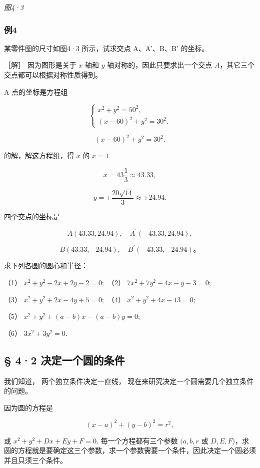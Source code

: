 \emph{图4·3}

\subsubsection{例4}\label{ux4f8b4-7}

某零件图的尺寸如图4·3 所示，试求交点 A、A'、B、B' 的坐标。

［解］ 因为图形是关于 \(x\) 轴和 \(y\) 轴对称的，因此只要求出一个交点
\(A\)，其它三个交点都可以根据对称性质得到。

A 点的坐标是方程组

\[
\left\{ \begin{array}{l} x^{2} + y^{2} = 50^{2}, \\ (x - 60) ^ {2} + y^{2} = 30^{2}. \end{array} \right. \tag {1}
\]

\[
(x - 60) ^ {2} + y^{2} = 30^{2}. \tag {2}
\]

的解，解这方程组，得 \(x\) 的 \(x = 1\)

\[
x = 43 \frac {1}{3} \approx 43. 33,
\]

\[
y = \pm \frac {20 \sqrt {14}}{3} \approx \pm 24. 94.
\]

四个交点的坐标是

\[
A (43. 33, 24. 94), \quad A^{\prime} (- 43. 33, 24. 94),
\]

\[
B (43. 33, - 24. 94), \quad B^{\prime} (- 43. 33, - 24. 94)\text{。}
\]

求下列各圆的圆心和半径：

（1） \(x^{2} + y^{2} - 2x + 2y - 2 = 0;\) （2）
\(7x^{2} + 7y^{2} - 4x - y - 3 = 0;\)

（3） \(x^{2} + y^{2} + 2x - 4y + 5 = 0;\) （4）
\(x^{2} + y^{2} + 4x - 13 = 0;\)

（5） \(x^{2} + y^{2} + (a - b)x - (a - b)y = 0;\)

（6） \(3x^{2} + 3y^{2} = 0.\)

\subsection{§ 4·2
决定一个圆的条件}\label{ux51b3ux5b9aux4e00ux4e2aux5706ux7684ux6761ux4ef6}

我们知道， 两个独立条件决定一直线，
现在来研究决定一个圆需要几个独立条件的问题。

因为圆的方程是

\[
(x - a) ^ {2} + (y - b) ^ {2} = r^{2},
\]

或 \(x^{2} + y^{2} + Dx + Ey + F = 0.\) 每一个方程都有三个参数
\((a, b, r\) 或
\(D, E, F)\)，求圆的方程就是要确定这三个参数，求一个参数需要一个条件，因此决定一个圆必须并且只须三个条件。

